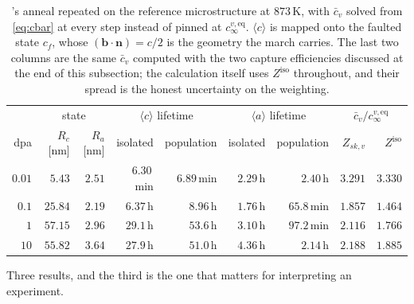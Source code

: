 \documentclass{article}
\newcommand{\aloop}{\ensuremath{\langle a\rangle}}
\newcommand{\cloop}{\ensuremath{\langle c\rangle}}
\newcommand{\bvec}{\bm b}
\newcommand{\nvec}{\bm n}
\begin{document}
\begin{table}[htbp]
\centering
\caption{'s anneal repeated on the reference
microstructure at $873\,$K, with $\bar c_v$ solved from \cref{eq:cbar} at every
step instead of pinned at $c^{v,\mathrm{eq}}_\infty$. \cloop{} is mapped onto the
faulted state $c_f$, whose $(\bvec\!\cdot\!\nvec)=c/2$ is the geometry the march
carries. The last two columns are the same $\bar c_v$ computed with the two
capture efficiencies discussed at the end of this subsection; the calculation
itself uses $Z^{\mathrm{iso}}$ throughout, and their spread is the honest
uncertainty on the weighting.}
\label{tab:anneal-population}
\begin{tabular}{@{}r r r r r r r r r@{}}
\toprule
 & \multicolumn{2}{c}{state}
 & \multicolumn{2}{c}{\cloop{} lifetime}
 & \multicolumn{2}{c}{\aloop{} lifetime}
 & \multicolumn{2}{c}{$\bar c_v/c^{v,\mathrm{eq}}_\infty$}\\
\cmidrule(lr){2-3}\cmidrule(lr){4-5}\cmidrule(lr){6-7}\cmidrule(lr){8-9}
dpa & $R_c$ [nm] & $R_a$ [nm]
 & isolated & population & isolated & population
 & $Z_{sk,v}$ & $Z^{\mathrm{iso}}$\\
\midrule
$0.01$ & $5.43$  & $2.51$ & $6.30\,$min & $6.89\,$min & $2.29\,$h & $2.40\,$h   & $3.291$ & $3.330$\\
$0.1$  & $25.84$ & $2.19$ & $6.37\,$h   & $8.96\,$h   & $1.76\,$h & $65.8\,$min & $1.857$ & $1.464$\\
$1$    & $57.15$ & $2.96$ & $29.1\,$h   & $53.6\,$h   & $3.10\,$h & $97.2\,$min & $2.116$ & $1.766$\\
$10$   & $55.82$ & $3.64$ & $27.9\,$h   & $51.0\,$h   & $4.36\,$h & $2.14\,$h   & $2.188$ & $1.885$\\
\bottomrule
\end{tabular}
\end{table}

Three results, and the third is the one that matters for interpreting an
experiment.
\end{document}
